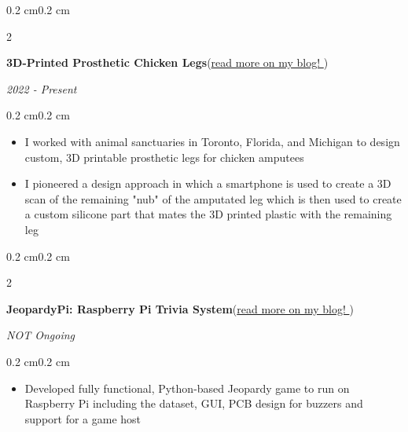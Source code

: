 \documentclass[10pt, letterpaper]{article}
\newenvironment{highlights}{
    \begin{itemize}[topsep=0.10 cm,parsep=0.10 cm,partopsep=0pt,itemsep=0pt,leftmargin=0.4 cm + 10pt]
}{
    \end{itemize}
}
\newenvironment{onecolentry}{
    \begin{adjustwidth}{0.2 cm}{0.2 cm}
}{
    \end{adjustwidth}
}
\newenvironment{twocolentry}[2][]{
    \onecolentry
    \def\secondColumn{#2}
    \setcolumnwidth{\fill, 4.5 cm}
    \begin{paracol}{2}
}{
    \switchcolumn \raggedleft \secondColumn
    \end{paracol}
    \endonecolentry
}
\let\hrefWithoutArrow\href
\renewcommand{\href}[2]{\hrefWithoutArrow{#1}{#2 \raisebox{.15ex}{\footnotesize \faExternalLink*}}}
\begin{document}
        \vspace{0.2 cm}

        \begin{twocolentry}{\textit{2022 - Present}}
            \textbf{3D-Printed Prosthetic Chicken Legs}(\href{https://elijahparker000.com/projects/Prosthetic-Chicken-Leg-Mk-2-Una/}{read more on my blog!})
        \end{twocolentry}
        \vspace{0.10 cm}
        \begin{onecolentry}
            \begin{highlights}
                \item I worked with animal sanctuaries in Toronto, Florida, and Michigan to design custom, 3D printable prosthetic legs for chicken amputees
                \item I pioneered a design approach in which a smartphone is used to create a 3D scan of the remaining "nub" of the amputated leg which is then used to create a custom silicone part that mates the 3D printed plastic with the remaining leg
            \end{highlights}
        \end{onecolentry}

        \vspace{0.2 cm}

        \begin{twocolentry}{\textit{NOT Ongoing}}
            \textbf{JeopardyPi: Raspberry Pi Trivia System}(\href{https://elijahparker000.com/projects/JeopardyPi/}{read more on my blog!})
        \end{twocolentry}
        \vspace{0.10 cm}
        \begin{onecolentry}
            \begin{highlights}
                \item Developed fully functional, Python-based Jeopardy game to run on Raspberry Pi including the dataset, GUI, PCB design for buzzers and support for a game host 
            \end{highlights}
        \end{onecolentry}
\end{document}
